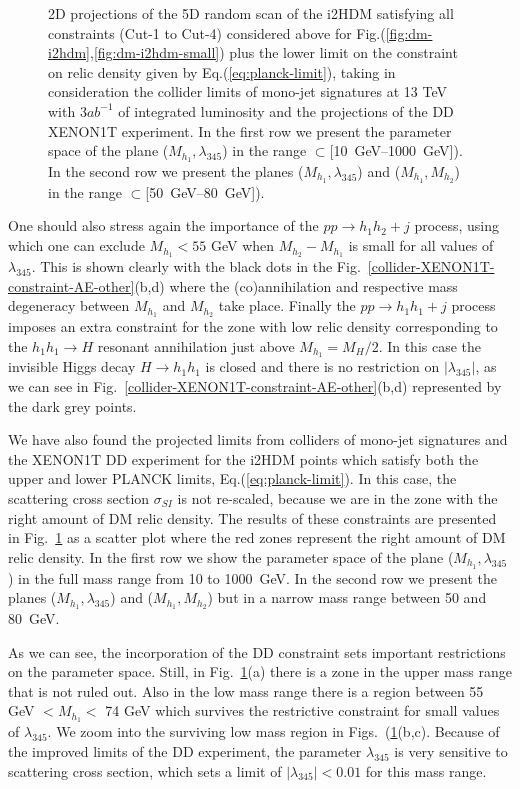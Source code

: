 \begin{figure}[htb]
\caption{2D projections of the 5D random scan of the i2HDM satisfying all constraints (Cut-1 to Cut-4) considered above for Fig.(\ref{fig:dm-i2hdm},\ref{fig:dm-i2hdm-small}) plus the lower limit on the constraint on relic density given by Eq.(\ref{eq:planck-limit}), taking in consideration the collider limits of mono-jet signatures at 13 TeV with 3$ab^{-1}$ of integrated luminosity and the projections of the DD XENON1T experiment. In the first row we present the parameter space of the plane ($M_{h_1},\lambda_{345}$) in the range $\subset $[10~GeV--1000~GeV]). In the second row we present the planes ($M_{h_1},\lambda_{345}$) and ($M_{h_1},M_{h_2}$) in the range $ \subset $[50~GeV--80~GeV]).} \label{fig:dm-i2hdm-LHC-DD}
\end{figure}

One should also stress again the  importance of the   $pp \to h_1h_2+j$ process,
using which  one can exclude $M_{h_1}<55$ GeV when  $M_{h_2}-M_{h_1}$ is small
for all values of $\lambda_{345}$.
 This is shown clearly  with the black dots in the Fig.~\ref{collider-XENON1T-constraint-AE-other}(b,d) where the (co)annihilation and respective mass degeneracy between $M_{h_1}$ and $M_{h_2}$ take place. Finally the $pp \to h_1 h_1 + j$ process imposes an extra constraint for the zone with low relic density corresponding to the $h_1h_1 \to H$ resonant annihilation just above $M_{h_1}=M_H/2$. In this case the invisible Higgs decay $H \to h_1h_1$ is closed and there is no restriction on $|\lambda_{345}|$, as we can see in Fig.~\ref{collider-XENON1T-constraint-AE-other}(b,d) represented by the dark grey points.

We have also found the  projected limits from colliders of mono-jet signatures  and the XENON1T DD experiment for the i2HDM points which satisfy both the upper and lower PLANCK limits, Eq.(\ref{eq:planck-limit}). In this case, the scattering cross section $\sigma_{SI}$ is not re-scaled, because we are in the zone with the right amount of DM relic density. The results of these constraints are presented in Fig.~\ref{fig:dm-i2hdm-LHC-DD} as a scatter plot where the red zones represent the right amount of DM relic density. In the first row we show the parameter space of the plane ($M_{h_1},\lambda_{345}$) in the full
mass range from 10 to 1000~GeV. In the second row we present the planes ($M_{h_1},\lambda_{345}$) and ($M_{h_1},M_{h_2}$) but in a narrow mass range 
between 50 and 80~GeV.
%

As we can see, the incorporation of the DD constraint sets important restrictions on the parameter space. Still, in Fig.~\ref{fig:dm-i2hdm-LHC-DD}(a) there is a zone in the upper mass range that is not ruled out. Also in the low mass range there is a region between 55 GeV $< M_{h_1} <$ 74 GeV
which survives the restrictive constraint for small values of $\lambda_{345}$. We zoom into the surviving low mass region in Figs.~(\ref{fig:dm-i2hdm-LHC-DD}(b,c). Because of the improved limits of the DD experiment, the parameter $\lambda_{345}$ is very sensitive to scattering cross section, 
which sets a limit of $|\lambda_{345}|<0.01$ for this mass range.

